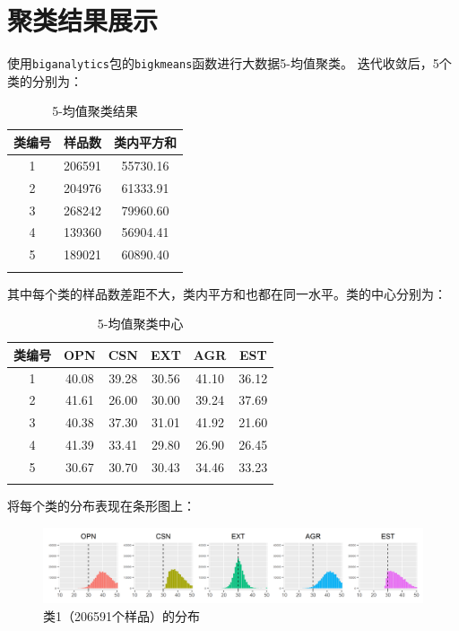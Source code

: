 \documentclass[UTF8]{ctexart}
\begin{document}
\section{聚类结果展示}
使用\texttt{biganalytics}包的\texttt{bigkmeans}函数进行大数据5-均值聚类。
迭代收敛后，5个类的分别为：
\begin{longtable}{c|c|c}
  \hline
  类编号 & 样品数    & 类内平方和    \\\hline
  1   & 206591 & 55730.16 \\\hline
  2   & 204976 & 61333.91 \\\hline
  3   & 268242 & 79960.60 \\\hline
  4   & 139360 & 56904.41 \\\hline
  5   & 189021 & 60890.40 \\\hline
  \caption{5-均值聚类结果}
\end{longtable}
其中每个类的样品数差距不大，类内平方和也都在同一水平。类的中心分别为：
\begin{longtable}{c|c|c|c|c|c}
  \hline
  类编号 & OPN   & CSN   & EXT   & AGR   & EST   \\\hline
  1   & 40.08 & 39.28 & 30.56 & 41.10 & 36.12 \\\hline
  2   & 41.61 & 26.00 & 30.00 & 39.24 & 37.69 \\\hline
  3   & 40.38 & 37.30 & 31.01 & 41.92 & 21.60 \\\hline
  4   & 41.39 & 33.41 & 29.80 & 26.90 & 26.45 \\\hline
  5   & 30.67 & 30.70 & 30.43 & 34.46 & 33.23 \\\hline
  \caption{5-均值聚类中心}
  \label{center}
\end{longtable}
\noindent 将每个类的分布表现在条形图上：
\begin{figure}[H]
  \centering
  \includegraphics[scale=0.478]{Cluster1.png}
  \caption{类1（206591个样品）的分布}
\end{figure}
\end{document}
